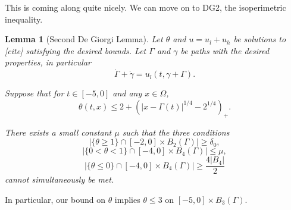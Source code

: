 \documentclass[11pt]{amsart}
\newtheorem{lemma}[theorem]{Lemma}
\theoremstyle{remark}
\newcommand{\paren}[1]{\left( #1 \right)}
\newcommand{\abs}[1]{\left\lvert #1 \right\rvert}
\newcommand{\ulow}{u_l}
\newcommand{\uhigh}{u_h}
\begin{document}
This is coming along quite nicely.  We can move on to DG2, the isoperimetric inequality.  

\begin{lemma}[Second De Giorgi Lemma]
Let $\theta$ and $u = \ulow + \uhigh$ be solutions to [cite] satisfying the desired bounds.  Let $\Gamma$ and $\gamma$ be paths with the desired properties, in particular
\[ \dot{\Gamma} +\dot{\gamma} = \ulow(t,\gamma + \Gamma). \]

Suppose that for $t \in [-5,0]$ and any $x \in \Omega$,
\[ \theta(t,x) \leq 2 + \paren{|x-\Gamma(t)|^{1/4}-2^{1/4}}_+. \]

There exists a small constant $\mu$ such that the three conditions
\[ \abs{\{\theta \geq 1\} \cap [-2,0]\times B_2(\Gamma)} \geq \delta_0, \]
\[ \abs{\{0 < \theta < 1\} \cap [-4,0]\times B_4(\Gamma)} \leq \mu, \]
\[ \abs{\{\theta \leq 0\} \cap [-4,0]\times B_4(\Gamma)} \geq \frac{4 |B_4|}{2} \]
cannot simultaneously be met.  
\end{lemma}

In particular, our bound on $\theta$ implies $\theta \leq 3$ on $[-5,0] \times B_3(\Gamma)$.  
\end{document}
